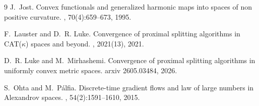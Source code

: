 \documentclass[11pt]{article}
\begin{document}
\begin{thebibliography}{9}
J.~Jost.
\newblock Convex functionals and generalized harmonic maps into spaces of non
  positive curvature.
, 70(4):659--673, 1995.

F.~Lauster and D.~R. Luke.
\newblock Convergence of proximal splitting algorithms in {{CAT}}({{$\kappa$}})
  spaces and beyond.
, 2021(13), 2021.

%
%
D.~R. Luke and M.~Mirhashemi.
\newblock Convergence of proximal splitting algorithms in uniformly convex
  metric spaces.
\newblock arxiv 2605.03484, 2026.

S.~Ohta and M.~P{\'a}lfia.
\newblock Discrete-time gradient flows and law of large numbers in
  {{Alexandrov}} spaces.
, 54(2):1591--1610, 2015.

%
%
%
\end{thebibliography}
\end{document}
